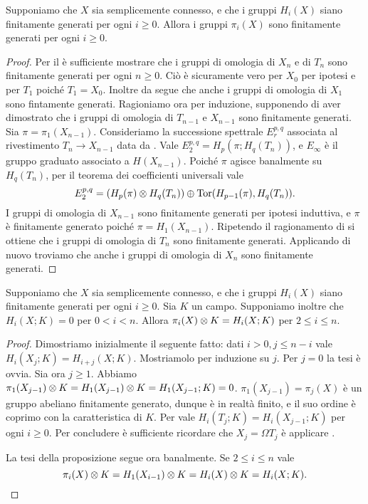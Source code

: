 \begin{proposition}
Supponiamo che $X$ sia semplicemente connesso, e che i gruppi $H_i(X)$ siano finitamente generati per ogni $i\ge 0$. Allora i gruppi $\pi_i(X)$ sono finitamente generati per ogni $i\ge 0$.
\end{proposition}
\begin{proof}
Per il  è sufficiente mostrare che i gruppi di omologia di $X_n$ e di $T_n$ sono finitamente generati per ogni $n\ge 0$. Ciò è sicuramente vero per $X_0$ per ipotesi e per $T_1$ poiché $T_1=X_0$. Inoltre da \missing{} segue che anche i gruppi di omologia di $X_1$ sono fintamente generati. Ragioniamo ora per induzione, supponendo di aver dimostrato che i gruppi di omologia di $T_{n-1}$ e $X_{n-1}$ sono finitamente generati. Sia $\pi=\pi_1(X_{n-1})$. Consideriamo la successione spettrale $E^{p,q}_r$ associata al rivestimento $T_n\rightarrow X_{n-1}$ data da \missing{}. Vale $E^{p,q}_2=H_p(\pi;H_q(T_n))$, e $E_\infty$ è il gruppo graduato associato a $H(X_{n-1})$. Poiché $\pi$ agisce banalmente su $H_q(T_n)$, per il teorema dei coefficienti universali vale
$$
E^{p,q}_2=(H_p(\pi)\mathbin{\otimes} H_q(T_n))\mathbin{\oplus}\operatorname{Tor}(H_{p-1}(\pi),H_q(T_n)).
$$
I gruppi di omologia di $X_{n-1}$ sono finitamente generati per ipotesi induttiva, e $\pi$ è finitamente generato poiché $\pi=H_1(X_{n-1})$. \mistery{} %
Ripetendo il ragionamento di \missing{} si ottiene che i gruppi di omologia di $T_n$ sono finitamente generati. Applicando di nuovo \missing{} troviamo che anche i gruppi di omologia di $X_n$ sono finitamente generati.
\end{proof}

\begin{proposition}
Supponiamo che $X$ sia semplicemente connesso, e che i gruppi $H_i(X)$ siano finitamente generati per ogni $i\ge 0$. Sia $K$ un campo. Supponiamo inoltre che $H_i(X;K)=0$ per $0<i<n$. Allora $\pi_i(X)\mathbin{\otimes} K=H_i(X;K)$ per $2\le i\le n$.
\end{proposition}
\begin{proof}
Dimostriamo inizialmente il seguente fatto: dati $i>0,j\le n-i$ vale $H_i(X_j;K)=H_{i+j}(X;K)$.
Mostriamolo per induzione su $j$. Per $j=0$ la tesi è ovvia. Sia ora $j\ge 1$. Abbiamo $\pi_1(X_{j-1})\mathbin{\otimes} K=H_1(X_{j-1})\mathbin{\otimes} K=H_1(X_{j-1};K)=0$. $\pi_1(X_{j-1})=\pi_j(X)$ è un gruppo abeliano finitamente generato, dunque è in realtà finito, e il suo ordine è coprimo con la caratteristica di $K$. Per \missing{} vale $H_i(T_j;K)=H_i(X_{j-1};K)$ per ogni $i\ge 0$. Per concludere è sufficiente ricordare che $X_j=\Omega T_j$ è applicare \missing{}.

La tesi della proposizione segue ora banalmente. Se $2\le i\le n$ vale
$$
\pi_i(X)\mathbin{\otimes} K=H_1(X_{i-1})\mathbin{\otimes} K=H_i(X)\mathbin{\otimes} K=H_i(X;K).
$$
\end{proof}

